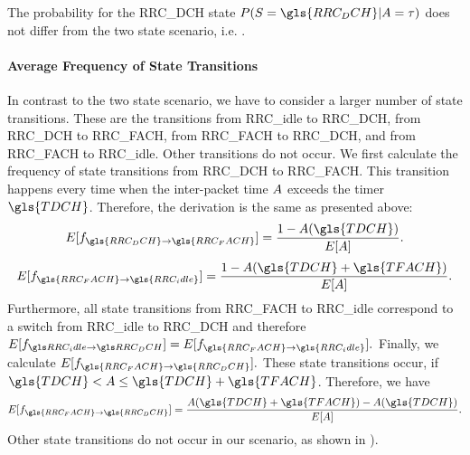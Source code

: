 The probability for the \gls{RRC_DCH} state \(P(\RRCState=\gls{RRC_DCH} \vert \PacketIAT = \ObservationIntervalLength)\) does not differ from the two state scenario, i.e. .

\paragraph*{Average Frequency of State Transitions}

\newcommand{\fStateTransitionsDCHToFACH}{f_{\gls{RRC_DCH}\rightarrow\gls{RRC_FACH}}}
\newcommand{\fStateTransitionsFACHToIdle}{f_{\gls{RRC_FACH}\rightarrow\gls{RRC_idle}}}
\newcommand{\fStateTransitionsFACHToDCH}{f_{\gls{RRC_FACH}\rightarrow\gls{RRC_DCH}}}

In contrast to the two state scenario, we have to consider a larger number of state transitions. These are the transitions from \gls{RRC_idle} to \gls{RRC_DCH}, from \gls{RRC_DCH} to \gls{RRC_FACH}, from \gls{RRC_FACH} to \gls{RRC_DCH}, and from \gls{RRC_FACH} to \gls{RRC_idle}.
Other transitions do not occur.
We first calculate the frequency of state transitions from \gls{RRC_DCH} to \gls{RRC_FACH}.
This transition happens every time when the inter-packet time \(A\) exceeds the timer \(\gls{TDCH}\).
Therefore, the derivation is the same as presented above:
\begin{equation}
E[\fStateTransitionsDCHToFACH]=\frac{1-\PacketIAT(\gls{TDCH})}{E[\PacketIAT]}.
\end{equation}
\begin{equation}
E[\fStateTransitionsFACHToIdle]=\frac{1-\PacketIAT(\gls{TDCH}+\gls{TFACH})}{E[\PacketIAT]}.
\end{equation}
Furthermore, all state transitions from \gls{RRC_FACH} to \gls{RRC_idle} correspond to a switch from \gls{RRC_idle} to \gls{RRC_DCH} and therefore 
\(E[\fStateTransitionsIdleToDCH]=E[\fStateTransitionsFACHToIdle].\)
Finally, we calculate \(E[\fStateTransitionsFACHToDCH].\)
These state transitions occur, if \(\gls{TDCH}<\PacketIAT \leq \gls{TDCH}+\gls{TFACH}\).
Therefore, we have 
\begin{equation}
E[\fStateTransitionsFACHToDCH]=\frac{\PacketIAT(\gls{TDCH}+\gls{TFACH})-\PacketIAT(\gls{TDCH})}{E[\PacketIAT]}.
\end{equation}
Other state transitions do not occur in our scenario, as shown in ).

